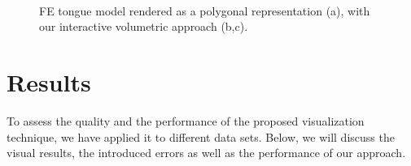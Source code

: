 \documentclass[review,journal]{vgtc}         %
\begin{document}
\begin{figure}
    \centering 
    \\
    \caption{FE tongue model rendered as a polygonal representation (a), with our interactive volumetric approach (b,c).}
    \label{fig:tongue}
\end{figure}

\section{Results}\label{sec:results}

To assess the quality and the performance of the proposed visualization technique, we have applied it to different data sets. Below, we will discuss the visual results, the introduced errors as well as the performance of our approach.
\end{document}
